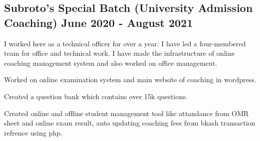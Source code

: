 \documentclass[a4paper,12pt]{article}
\begin{document}


\subsection{{Subroto's Special Batch (University Admission Coaching) \hfill June 2020 - August 2021}}
\vspace*{3pt}
I worked here as a technical officer for over a year. I have led a four-membered team for office and technical work. I have made the infrastructure of online coaching management system and also worked on office management. 
\begin{zitemize}
\item Worked on online examination system and main website of coaching in wordpress. 
\item Created a question bank which contains over 15k questions.
\item Created online and offline student management tool like attandance from OMR sheet and online exam result,  auto updating coaching fees from bkash transaction refrence using php.
\end{zitemize}
\end{document}

